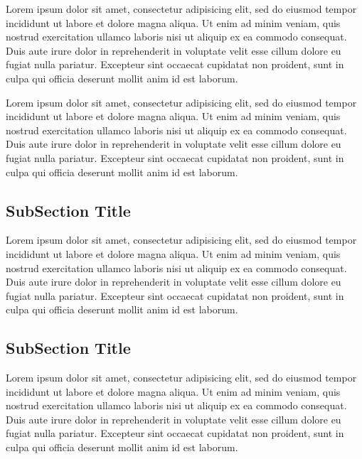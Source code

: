 Lorem ipsum dolor sit amet, consectetur adipisicing elit, sed do eiusmod tempor incididunt ut labore et dolore magna aliqua. Ut enim ad minim veniam, quis nostrud exercitation ullamco laboris nisi ut aliquip ex ea commodo consequat. Duis aute irure dolor in reprehenderit in voluptate velit esse cillum dolore eu fugiat nulla pariatur. Excepteur sint occaecat cupidatat non proident, sunt in culpa qui officia deserunt mollit anim id est laborum.

Lorem ipsum dolor sit amet, consectetur adipisicing elit, sed do eiusmod tempor incididunt ut labore et dolore magna aliqua. Ut enim ad minim veniam, quis nostrud exercitation ullamco laboris nisi ut aliquip ex ea commodo consequat. Duis aute irure dolor in reprehenderit in voluptate velit esse cillum dolore eu fugiat nulla pariatur. Excepteur sint occaecat cupidatat non proident, sunt in culpa qui officia deserunt mollit anim id est laborum.

\subsection{SubSection Title}
Lorem ipsum dolor sit amet, consectetur adipisicing elit, sed do eiusmod tempor incididunt ut labore et dolore magna aliqua. Ut enim ad minim veniam, quis nostrud exercitation ullamco laboris nisi ut aliquip ex ea commodo consequat. Duis aute irure dolor in reprehenderit in voluptate velit esse cillum dolore eu fugiat nulla pariatur. Excepteur sint occaecat cupidatat non proident, sunt in culpa qui officia deserunt mollit anim id est laborum.

\subsection{SubSection Title}
Lorem ipsum dolor sit amet, consectetur adipisicing elit, sed do eiusmod tempor incididunt ut labore et dolore magna aliqua. Ut enim ad minim veniam, quis nostrud exercitation ullamco laboris nisi ut aliquip ex ea commodo consequat. Duis aute irure dolor in reprehenderit in voluptate velit esse cillum dolore eu fugiat nulla pariatur. Excepteur sint occaecat cupidatat non proident, sunt in culpa qui officia deserunt mollit anim id est laborum.